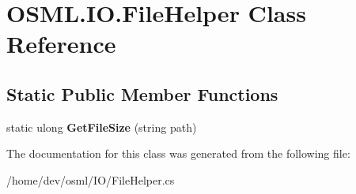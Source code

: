 \hypertarget{classOSML_1_1IO_1_1FileHelper}{}\section{O\+S\+M\+L.\+I\+O.\+File\+Helper Class Reference}
\label{classOSML_1_1IO_1_1FileHelper}
\subsection*{Static Public Member Functions}
\begin{DoxyCompactItemize}
\item 
\mbox{\label{classOSML_1_1IO_1_1FileHelper_aa1ae35137610651cefdfc2481437b68d}} 
static ulong {\bfseries Get\+File\+Size} (string path)
\end{DoxyCompactItemize}


The documentation for this class was generated from the following file\+:\begin{DoxyCompactItemize}
\item 
/home/dev/osml/\+I\+O/File\+Helper.\+cs\end{DoxyCompactItemize}
